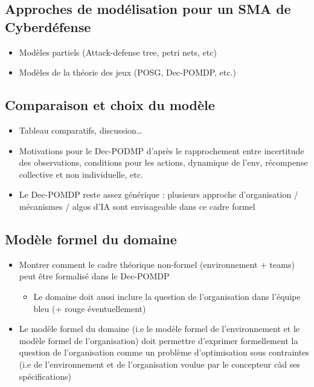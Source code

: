 \documentclass{article}
\begin{document}
\subsection{Approches de modélisation pour un SMA de Cyberdéfense}
\begin{itemize}

    \item Modèles partiels (Attack-defense tree, petri nets, etc)
    \item Modèles de la théorie des jeux (POSG, Dec-POMDP, etc.)
\end{itemize}

\subsection{Comparaison et choix du modèle}
\begin{itemize}

    \item Tableau comparatifs, discussion…
    \item Motivations pour le Dec-PODMP d’après le rapprochement entre incertitude des observations, conditions pour les actions, dynamique de l’env, récompense collective et non individuelle, etc.
    \item Le Dec-POMDP reste assez générique : plusieurs approche d’organisation / mécanismes / algos d’IA sont envisageable dans ce cadre formel
\end{itemize}

\subsection{Modèle formel du domaine}
\begin{itemize}

    \item Montrer comment le cadre théorique non-formel (environnement + teams) peut être formalisé dans le Dec-POMDP
          \begin{itemize}
              \item Le domaine doit aussi inclure la question de l'organisation dans l'équipe bleu (+ rouge éventuellement)
          \end{itemize}
    \item Le modèle formel du domaine (i.e le modèle formel de l'environnement et le modèle formel de l'organisation) doit permettre d'exprimer formellement la question de l'organisation comme un problème d'optimisation sous contraintes (i.e de l'environnement et de l'organisation voulue par le concepteur càd ses spécifications)
\end{itemize}
\end{document}
